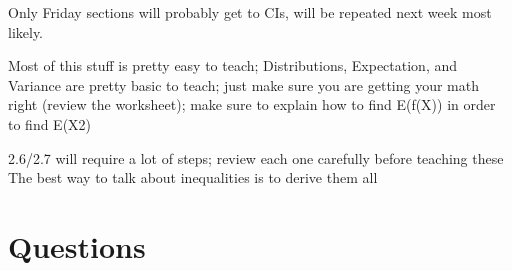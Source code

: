 \documentclass{exam}
\begin{document}
\begin{questions}
\item Only Friday sections will probably get to CIs, will be repeated next week most likely. 

\item Most of this stuff is pretty easy to teach; Distributions, Expectation, and Variance are pretty basic to teach; just make sure you are getting your math right (review the worksheet); make sure to explain how to find E(f(X)) in order to find E(X2)
\item 2.6/2.7 will require a lot of steps; review each one carefully before teaching these
The best way to talk about inequalities is to derive them all
\end{questions}

\section{Questions}
 
\end{document}
